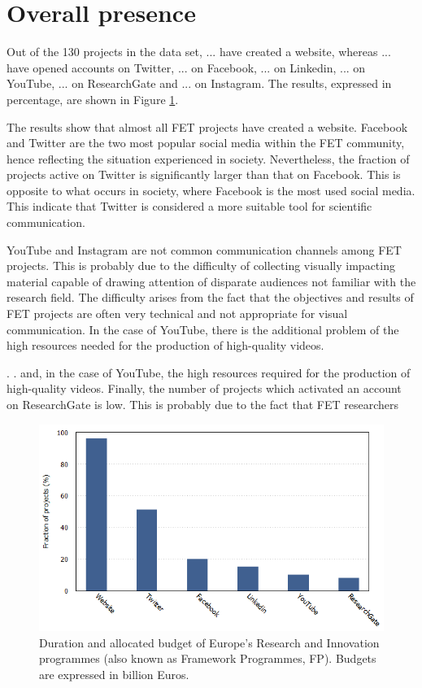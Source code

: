 \section{Overall presence}
Out of the 130 projects in the data set, ... have created a website, whereas ... have opened accounts on Twitter, ... on Facebook, ... on  Linkedin, ... on YouTube, ... on ResearchGate and ... on Instagram. The results, expressed in percentage, are shown in Figure \ref{Social_media}.

The results show that almost all FET projects have created a website. Facebook and Twitter are the two most popular social media within the FET community, hence reflecting the situation experienced in society. Nevertheless, the fraction of projects active on Twitter is significantly larger than that on Facebook. This is opposite to what occurs in society, where Facebook is the most used social media. This indicate that Twitter is considered a more suitable tool for scientific communication. 

YouTube and Instagram are not common communication channels among FET projects. This is probably due to the difficulty of collecting visually impacting material capable of drawing attention of disparate audiences not familiar with the research field. The difficulty arises from the fact that the objectives and results of FET projects are often very technical and not appropriate for visual communication. In the case of YouTube, there is the additional problem of the high resources needed for the production of high-quality videos.

. .  and, in the case of YouTube, the high resources required for the production of high-quality videos. Finally, the number of projects which activated an account on ResearchGate is low. This is probably due to the fact that FET researchers 

\begin{figure}[!t] 
 \begin{center}
 \includegraphics[scale=0.4]{Images/Social_media.png}
 \caption{Duration and allocated budget of Europe's Research and Innovation programmes (also known as Framework Programmes, FP). Budgets are expressed in billion Euros.}
 \label{Social_media}
 \end{center}
\end{figure}

